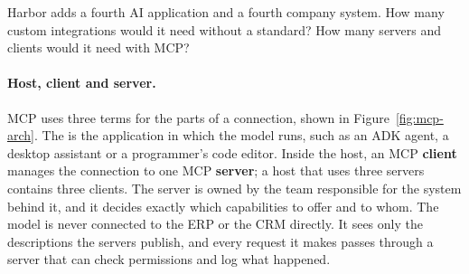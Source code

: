 \begin{quickcheck}
Harbor adds a fourth AI application and a fourth company system. How many custom integrations would it need without a standard? How many servers and clients would it need with MCP?
\end{quickcheck}

\paragraph{Host, client and server.} MCP uses three terms for the parts of a connection, shown in Figure~\ref{fig:mcp-arch}. The  is the application in which the model runs, such as an ADK agent, a desktop assistant or a programmer's code editor. Inside the host, an MCP \textbf{client} manages the connection to one MCP \textbf{server}; a host that uses three servers contains three clients. The server is owned by the team responsible for the system behind it, and it decides exactly which capabilities to offer and to whom. The model is never connected to the ERP or the CRM directly. It sees only the descriptions the servers publish, and every request it makes passes through a server that can check permissions and log what happened.


